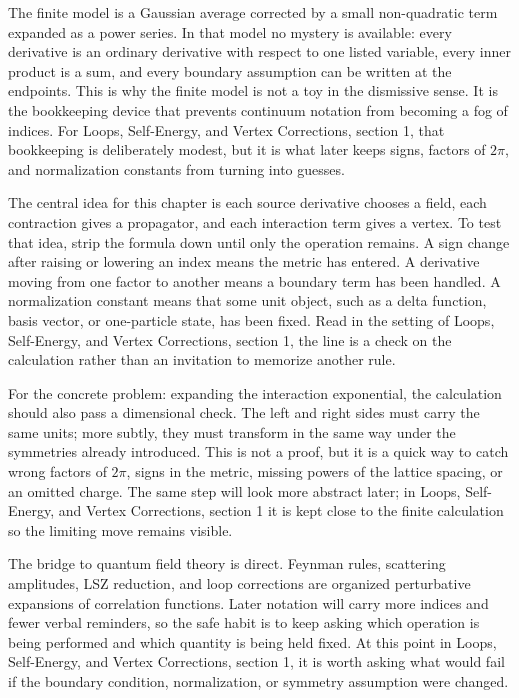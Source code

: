 The finite model is a Gaussian average corrected by a small non-quadratic term expanded as a power series.  In that model no mystery is available: every derivative is an ordinary derivative with respect to one listed variable, every inner product is a sum, and every boundary assumption can be written at the endpoints.  This is why the finite model is not a toy in the dismissive sense.  It is the bookkeeping device that prevents continuum notation from becoming a fog of indices.  For Loops, Self-Energy, and Vertex Corrections, section 1, that bookkeeping is deliberately modest, but it is what later keeps signs, factors of \(2\pi\), and normalization constants from turning into guesses.

The central idea for this chapter is each source derivative chooses a field, each contraction gives a propagator, and each interaction term gives a vertex.  To test that idea, strip the formula down until only the operation remains.  A sign change after raising or lowering an index means the metric has entered.  A derivative moving from one factor to another means a boundary term has been handled.  A normalization constant means that some unit object, such as a delta function, basis vector, or one-particle state, has been fixed.  Read in the setting of Loops, Self-Energy, and Vertex Corrections, section 1, the line is a check on the calculation rather than an invitation to memorize another rule.

For the concrete problem: expanding the interaction exponential, the calculation should also pass a dimensional check.  The left and right sides must carry the same units; more subtly, they must transform in the same way under the symmetries already introduced.  This is not a proof, but it is a quick way to catch wrong factors of \(2\pi\), signs in the metric, missing powers of the lattice spacing, or an omitted charge.  The same step will look more abstract later; in Loops, Self-Energy, and Vertex Corrections, section 1 it is kept close to the finite calculation so the limiting move remains visible.

The bridge to quantum field theory is direct.  Feynman rules, scattering amplitudes, LSZ reduction, and loop corrections are organized perturbative expansions of correlation functions.  Later notation will carry more indices and fewer verbal reminders, so the safe habit is to keep asking which operation is being performed and which quantity is being held fixed.  At this point in Loops, Self-Energy, and Vertex Corrections, section 1, it is worth asking what would fail if the boundary condition, normalization, or symmetry assumption were changed.

